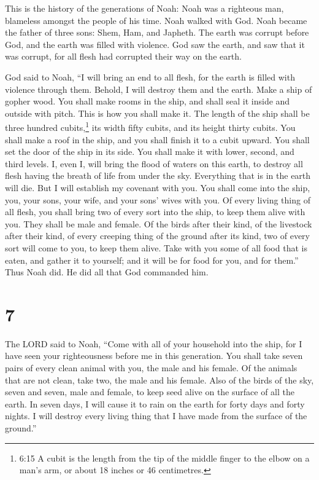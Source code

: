  This is the history of the generations of Noah: Noah was a
righteous man, blameless amongst the people of his time. Noah walked
with God.  Noah became the father of three sons: Shem, Ham,
and Japheth.  The earth was corrupt before God, and the
earth was filled with violence.  God saw the earth, and saw
that it was corrupt, for all flesh had corrupted their way on the earth.

 God said to Noah, ``I will bring an end to all flesh, for
the earth is filled with violence through them. Behold, I will destroy
them and the earth.  Make a ship of gopher wood. You shall
make rooms in the ship, and shall seal it inside and outside with pitch.
 This is how you shall make it. The length of the ship
shall be three hundred cubits,\footnote{6:15 A cubit is the length from
  the tip of the middle finger to the elbow on a man's arm, or about 18
  inches or 46 centimetres.} its width fifty cubits, and its height
thirty cubits.  You shall make a roof in the ship, and you
shall finish it to a cubit upward. You shall set the door of the ship in
its side. You shall make it with lower, second, and third levels.
 I, even I, will bring the flood of waters on this earth,
to destroy all flesh having the breath of life from under the sky.
Everything that is in the earth will die.  But I will
establish my covenant with you. You shall come into the ship, you, your
sons, your wife, and your sons' wives with you.  Of every
living thing of all flesh, you shall bring two of every sort into the
ship, to keep them alive with you. They shall be male and female.
 Of the birds after their kind, of the livestock after
their kind, of every creeping thing of the ground after its kind, two of
every sort will come to you, to keep them alive.  Take with
you some of all food that is eaten, and gather it to yourself; and it
will be for food for you, and for them.''  Thus Noah did.
He did all that God commanded him.

\hypertarget{section-6}{%
\section{7}\label{section-6}}

 The LORD said to Noah, ``Come with all of your household
into the ship, for I have seen your righteousness before me in this
generation.  You shall take seven pairs of every clean
animal with you, the male and his female. Of the animals that are not
clean, take two, the male and his female.  Also of the birds
of the sky, seven and seven, male and female, to keep seed alive on the
surface of all the earth.  In seven days, I will cause it to
rain on the earth for forty days and forty nights. I will destroy every
living thing that I have made from the surface of the ground.''

